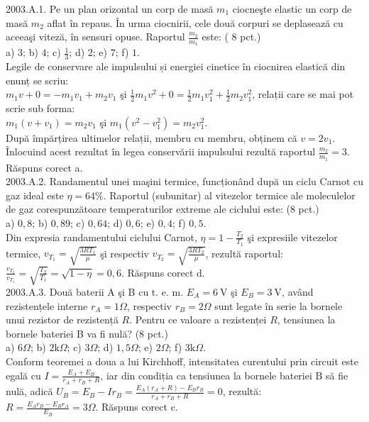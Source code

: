 
2003.A.1. Pe un plan orizontal un corp de masă $m_{1}$ ciocneşte elastic un corp de masă $m_{2}$ aflat în repaus. În urma ciocnirii, cele două corpuri se deplasează cu aceeaşi viteză, în sensuri opuse. Raportul $\frac{m_{2}}{m_{1}}$ este: ( 8 pct.)\\ a) $3$; b) $4$; c) $\frac{1}{3}$; d) $2$; e) $7$; f) $1$.\\ Legile de conservare ale impulsului și energiei cinetice în ciocnirea elastică din enunț se scriu:\\ $m_{1} v+0=-m_{1} v_{1}+m_{2} v_{1}$ şi $\frac{1}{2} m_{1} v^{2}+0=\frac{1}{2} m_{1} v_{1}^{2}+\frac{1}{2} m_{2} v_{1}^{2}$, relații care se mai pot scrie sub forma:\\ $m_{1}\left(v+v_{1}\right)=m_{2} v_{1}$ şi $m_{1}\left(v^{2}-v_{1}^{2}\right)=m_{2} v_{1}^{2}$.\\ După împărțirea ultimelor relații, membru cu membru, obținem că $v=2 v_{1}$. Înlocuind acest rezultat în legea conservării impulsului rezultă raportul $\frac{m_{2}}{m_{1}}=3$. Răspuns corect a.\\

2003.A.2. Randamentul unei maşini termice, funcționând după un ciclu Carnot cu gaz ideal este $\eta=64 \%$. Raportul (subunitar) al vitezelor termice ale moleculelor de gaz corespunzătoare temperaturilor extreme ale ciclului este: (8 pct.)\\ a) $0,8$; b) $0,89$; c) $0,64$; d) $0,6$; e) $0,4$; f) $0,5$.\\ Din expresia randamentului ciclului Carnot, $\eta=1-\frac{T_{2}}{T_{1}}$ şi expresiile vitezelor termice, $v_{T_{1}}=\sqrt{\frac{3 R T_{1}}{\mu}}$ şi respectiv $v_{T_{2}}=\sqrt{\frac{3 R T_{2}}{\mu}}$, rezultă raportul:\\ $\frac{v_{T_{2}}}{v_{T_{1}}}=\sqrt{\frac{T_{2}}{T_{1}}}=\sqrt{1-\eta}=0,6$. Răspuns corect d.\\

2003.A.3. Două baterii A şi B cu t. e. m. $E_{A}=6 \mathrm{~V}$ şi $E_{B}=3 \mathrm{~V}$, având rezistențele interne $r_{A}=1 \Omega$, respectiv $r_{B}=2 \Omega$ sunt legate în serie la bornele unui rezistor de rezistență $R$. Pentru ce valoare a rezistenței $R$, tensiunea la bornele bateriei B va fi nulă? (8 pct.)\\ a) $6 \Omega$; b) $2 \mathrm{k} \Omega$; c) $3 \Omega$; d) $1,5 \Omega$; e) $2 \Omega$; f) $3 \mathrm{k} \Omega$.\\ Conform teoremei a doua a lui Kirchhoff, intensitatea curentului prin circuit este egală cu $I=\frac{E_{A}+E_{B}}{r_{A}+r_{B}+R}$, iar din condiția ca tensiunea la bornele bateriei B să fie nulă, adică $U_{B}=E_{B}-I r_{B}=\frac{E_{A}\left(r_{A}+R\right)-E_{B} r_{B}}{r_{A}+r_{B}+R}=0$, rezultă:\\ $R=\frac{E_{A} r_{B}-E_{B} r_{A}}{E_{B}}=3 \Omega$. Răspuns corect c.\\

